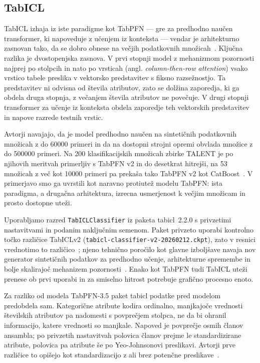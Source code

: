 \documentclass[a4paper,12pt,openright]{book}
\begin{document}
\subsection{TabICL}
\label{sec:tabicl}

TabICL izhaja iz iste paradigme kot TabPFN --- gre za predhodno naučen
transformer, ki napoveduje z učenjem iz konteksta --- vendar je arhitekturno
zasnovan tako, da se dobro obnese na večjih podatkovnih
množicah~\cite{qu2025tabicl}. Ključna razlika je dvostopenjska zasnova. V prvi
stopnji model z mehanizmom pozornosti najprej po stolpcih in nato po vrsticah
(angl. \emph{column-then-row attention}) vsako vrstico tabele preslika v
vektorsko predstavitev s fiksno razsežnostjo. Ta predstavitev ni odvisna od
števila atributov, zato se dolžina zaporedja, ki ga obdela druga stopnja, z
večanjem števila atributov ne povečuje. V drugi stopnji transformer za učenje iz
konteksta obdela zaporedje teh vektorskih predstavitev in napove razrede testnih
vrstic.

Avtorji navajajo, da je model predhodno naučen na sintetičnih podatkovnih
množicah z do \num{60000} primeri in da na dostopni strojni opremi obvlada
množice z do \num{500000} primeri. Na 200 klasifikacijskih množicah zbirke
TALENT je po njihovih meritvah primerljiv s TabPFN v2 in do desetkrat hitrejši,
na 53 množicah z več kot \num{10000} primeri pa prekaša tako TabPFN v2 kot
CatBoost~\cite{qu2025tabicl}. V primerjavo smo ga uvrstili kot naravno protiutež
modelu TabPFN: ista paradigma, a drugačna arhitektura, izrecna usmerjenost k
večjim množicam in prosto dostopne uteži.

Uporabljamo razred \texttt{TabICLClassifier} iz paketa tabicl~2.2.0 s privzetimi
nastavitvami in podanim naključnim semenom. Paket privzeto uporabi kontrolno
točko različice TabICLv2 (\texttt{tabicl-classifier-v2-20260212.ckpt}), zato v
resnici vrednotimo to različico~\cite{tabicldocs}; njeno tehnično poročilo kot
glavne izboljšave navaja nov generator sintetičnih podatkov za predhodno učenje,
arhitekturne spremembe in bolje skalirajoč mehanizem
pozornosti~\cite{qu2026tabiclv2}. Enako kot TabPFN tudi TabICL uteži prenese ob
prvi uporabi in za smiselno hitrost potrebuje grafično procesno enoto.

Za razliko od modela TabPFN-3.5 paket tabicl podatke pred modelom predobdela
sam. Kategorične atribute kodira ordinalno, manjkajoče vrednosti številskih
atributov pa nadomesti s povprečjem stolpca, ne da bi ohranil informacijo,
katere vrednosti so manjkale. Napoved je povprečje osmih članov ansambla; po
privzetih nastavitvah polovica članov prejme le standardizirane atribute,
polovica pa atribute še po Yeo-Johnsonovi preslikavi. Avtorji prve različice to
opišejo kot standardizacijo z ali brez potenčne preslikave~\cite{qu2025tabicl}.
\end{document}
